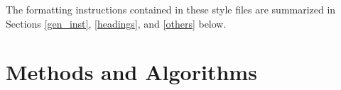 \documentclass{article}
\begin{document}
The formatting instructions contained in these style files are summarized in
Sections \ref{gen_inst}, \ref{headings}, and \ref{others} below.


% 
% 
% 
% 
% 
% 
% 
% 
% 
% 
% 

\section {Methods and Algorithms}
 
\end{document}
